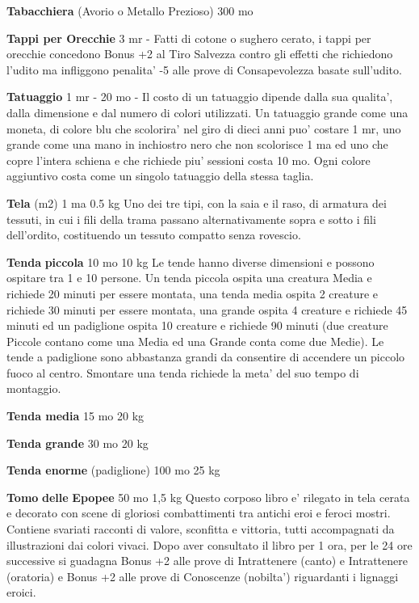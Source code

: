 \documentclass[a4paper,11pt,twoside,openany]{book}
\begin{document}
{\textbf{Tabacchiera} (Avorio o Metallo Prezioso) 300 mo

\textbf{Tappi per Orecchie} 3 mr - Fatti di cotone o sughero cerato, i tappi per orecchie concedono Bonus +2 al Tiro Salvezza contro gli effetti che richiedono l'udito ma infliggono penalita' -5 alle prove di Consapevolezza basate sull'udito.

\textbf{Tatuaggio} 1 mr - 20 mo - Il costo di un tatuaggio dipende dalla sua qualita', dalla dimensione e dal numero di colori utilizzati. Un tatuaggio grande come una moneta, di colore blu che scolorira' nel giro di dieci anni puo' costare 1 mr, uno grande come una mano in inchiostro nero che non scolorisce 1 ma ed uno che copre l'intera schiena e che richiede piu' sessioni costa 10 mo. Ogni colore aggiuntivo costa come un singolo tatuaggio della stessa taglia.

\textbf{Tela} (m2) 1 ma 0.5 kg Uno dei tre tipi, con la saia e il raso, di armatura dei tessuti, in cui i fili della trama passano alternativamente sopra e sotto i fili dell'ordito, costituendo un tessuto compatto senza rovescio.

\textbf{Tenda} \textbf{piccola} 10 mo 10 kg Le tende hanno diverse dimensioni e possono ospitare tra 1 e 10 persone. Un tenda piccola ospita una creatura Media e richiede 20 minuti per essere montata, una tenda media ospita 2 creature e richiede 30 minuti per essere montata, una grande ospita 4 creature e richiede 45 minuti ed un padiglione ospita 10 creature e richiede 90 minuti (due creature Piccole contano come una Media ed una Grande conta come due Medie). Le tende a padiglione sono abbastanza grandi da consentire di accendere un piccolo fuoco al centro. Smontare una tenda richiede la meta' del suo tempo di montaggio.

\textbf{Tenda media} 15 mo 20 kg

\textbf{Tenda grande} 30 mo 20 kg

\textbf{Tenda enorme} (padiglione) 100 mo 25 kg

\textbf{Tomo} \textbf{delle} \textbf{Epopee} 50 mo 1,5 kg Questo corposo libro e' rilegato in tela cerata e decorato con scene di gloriosi combattimenti tra antichi eroi e feroci mostri. Contiene svariati racconti di valore, sconfitta e vittoria, tutti accompagnati da illustrazioni dai colori vivaci. Dopo aver consultato il libro per 1 ora, per le 24 ore successive si guadagna Bonus +2 alle prove di Intrattenere (canto) e Intrattenere (oratoria) e Bonus +2 alle prove di Conoscenze (nobilta') riguardanti i lignaggi eroici.

}
\end{document}
